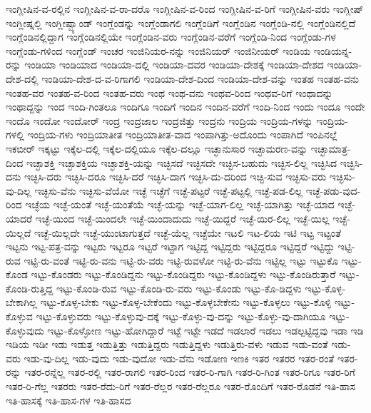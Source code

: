 {ಇಂಗ್ಲೀಷಿನ-ವ-ರಲ್ಲಿನ
ಇಂಗ್ಲೀಷಿನ-ವ-ರಾ-ದರೊ
ಇಂಗ್ಲೀಷಿನ-ವ-ರಿಂದ
ಇಂಗ್ಲೀಷಿನ-ವ-ರಿಗೆ
ಇಂಗ್ಲೀಷಿನ-ವರು
ಇಂಗ್ಲೀಷ್
ಇಂಗ್ಲೀಷ್ನಲ್ಲಿ
ಇಂಗ್ಲೀಷ್ಬ್ಯಾಂಡ್
ಇಂಗ್ಲೆಂಡನ್ನು
ಇಂಗ್ಲೆಂಡಾಗಲಿ
ಇಂಗ್ಲೆಂಡಿಗೆ
ಇಂಗ್ಲೆಂಡಿನ
ಇಂಗ್ಲೆಂಡಿ-ನಲ್ಲಿ
ಇಂಗ್ಲೆಂಡಿನಲ್ಲಿದೆ
ಇಂಗ್ಲೆಂಡಿನಲ್ಲಿದ್ದಾಗ
ಇಂಗ್ಲೆಂಡಿನಲ್ಲಿಯೇ
ಇಂಗ್ಲೆಂಡಿನ-ವರು
ಇಂಗ್ಲೆಂಡಿನ-ವರೆಗೆ
ಇಂಗ್ಲೆಂಡಿ-ನಿಂದ
ಇಂಗ್ಲೆಂಡು-ಗಳ
ಇಂಗ್ಲೆಂಡು-ಗಳಿಂದ
ಇಂಗ್ಲೆಂಡ್
ಇಂಚರ
ಇಂಜಿನಿಯರ-ನನ್ನು
ಇಂಜಿನಿಯರ್
ಇಂಜಿನೀಯರ್
ಇಂಡಿಯ
ಇಂಡಿಯನ್ನ-ರನ್ನು
ಇಂಡಿಯಾ
ಇಂಡಿಯಾದ
ಇಂಡಿಯಾ-ದಲ್ಲಿ
ಇಂಡಿಯಾ-ದವರ
ಇಂಡಿಯಾ-ದೇಶಕ್ಕೆ
ಇಂಡಿಯಾ-ದೇಶದ
ಇಂಡಿಯಾ-ದೇಶ-ದಲ್ಲಿ
ಇಂಡಿಯಾ-ದೇಶ-ದ-ವ-ರಿಗಾಗಲಿ
ಇಂಡಿಯಾ-ದೇಶ-ದಿಂದ
ಇಂಡಿಯಾ-ದೇಶ-ವನ್ನು
ಇಂತಹ
ಇಂತಹ-ವನು
ಇಂತಹ-ವರ
ಇಂತಹ-ವ-ರಿಂದ
ಇಂತಹ-ವರು
ಇಂಥ
ಇಂಥ-ವನು
ಇಂಥವ-ರಿಂದ
ಇಂಥವ-ರಿಗೆ
ಇಂಥಾದನ್ನು
ಇಂಥಾದ್ದನ್ನು
ಇಂದ
ಇಂದಿ-ಗಿಂತಲೂ
ಇಂದಿಗೂ
ಇಂದಿಗೆ
ಇಂದಿನ
ಇಂದಿನ-ವರೆಗೆ
ಇಂದಿ-ನಿಂದ
ಇಂದು
ಇಂದೂ
ಇಂದೇ
ಇಂದೊ
ಇಂದೋ
ಇಂದೋರ್
ಇಂದ್ರ
ಇಂದ್ರಜಾಲ
ಇಂದ್ರಜಿತ್ತು
ಇಂದ್ರನು
ಇಂದ್ರಿಯ
ಇಂದ್ರಿಯ-ಗಳನ್ನು
ಇಂದ್ರಿಯ-ಗಳಲ್ಲಿ
ಇಂದ್ರಿಯ-ಗಳು
ಇಂದ್ರಿಯಾತೀತ
ಇಂದ್ರಿಯಾತೀತ-ವಾದ
ಇಂಪಾಗಿತ್ತು-ಅದೊಂದು
ಇಂಪಾಗಿದೆ
ಇಂಪಿನಲ್ಲೆ
ಇಕಬೀರ್
ಇಕ್ಕಟ್ಟು
ಇಕ್ಕೆಲ-ದಲ್ಲಿ
ಇಕ್ಕೆಲ-ದಲ್ಲಿಯೂ
ಇಕ್ಕೆಲ-ದಲ್ಲೂ
ಇಚ್ಛಾನುಸಾರ
ಇಚ್ಛಾಮರಣ-ವನ್ನು
ಇಚ್ಛಾಮಾತ್ರ-ದಿಂದ
ಇಚ್ಛಾಶಕ್ತಿ
ಇಚ್ಛಾಶಕ್ತಿಯ
ಇಚ್ಛಾಶಕ್ತಿ-ಯನ್ನು
ಇಚ್ಛಿಸದೆ
ಇಚ್ಛಿಸದೇ
ಇಚ್ಛಿಸ-ಬಹುದು
ಇಚ್ಛಿಸ-ಲಿಲ್ಲ
ಇಚ್ಛಿಸಿದ
ಇಚ್ಛಿಸಿ-ದನು
ಇಚ್ಛಿಸಿ-ದರು
ಇಚ್ಛಿಸಿ-ದರೂ
ಇಚ್ಛಿಸಿ-ದರೆ
ಇಚ್ಛಿಸಿ-ದಾಗ
ಇಚ್ಛಿಸಿ-ದು-ದರಿಂದ
ಇಚ್ಛಿ-ಸುವ
ಇಚ್ಛಿಸು-ವರು
ಇಚ್ಛಿಸು-ವು-ದಿಲ್ಲ
ಇಚ್ಛಿಸು-ವೆನು
ಇಚ್ಛಿಸು-ವೆಯೋ
ಇಚ್ಛೆ
ಇಚ್ಛೆಗೆ
ಇಚ್ಛೆ-ಪಟ್ಟರೆ
ಇಚ್ಛೆ-ಪಟ್ಟಲ್ಲಿ
ಇಚ್ಛೆ-ಪಡ-ಲಿಲ್ಲ
ಇಚ್ಛೆ-ಪಡು-ವುದ-ರಿಂದ
ಇಚ್ಛೆಯ
ಇಚ್ಛೆ-ಯಂತೆ
ಇಚ್ಛೆ-ಯಂತೆಯೆ
ಇಚ್ಛೆ-ಯನ್ನು
ಇಚ್ಛೆ-ಯಾಗ-ಲಿಲ್ಲ
ಇಚ್ಛೆ-ಯಾಗಿತ್ತು
ಇಚ್ಛೆ-ಯಾದ
ಇಚ್ಛೆ-ಯಾದರೆ
ಇಚ್ಛೆ-ಯಿಂದ
ಇಚ್ಛೆ-ಯಿಂದಲೇ
ಇಚ್ಛೆ-ಯಿಂದಾದುದು
ಇಚ್ಛೆ-ಯಿದ್ದರೆ
ಇಚ್ಛೆ-ಯಿರ-ಲಿಲ್ಲ
ಇಚ್ಛೆ-ಯಿಲ್ಲ
ಇಚ್ಛೆ-ಯಿಲ್ಲದೆ
ಇಚ್ಛೆ-ಯಿಲ್ಲದೇ
ಇಚ್ಛೆ-ಯುಂಟಾಗುತ್ತದೆ
ಇಚ್ಛೆ-ಯೆಲ್ಲ
ಇಚ್ಛೆಯೇ
ಇಟಲಿ
ಇಟ-ಲಿಯ
ಇಟಿ
ಇಟ್ಟ
ಇಟ್ಟಂತೆ
ಇಟ್ಟನು
ಇಟ್ಟ-ಪತ್ರ-ವನ್ನು
ಇಟ್ಟರು
ಇಟ್ಟರೂ
ಇಟ್ಟರೆ
ಇಟ್ಟಾಗ
ಇಟ್ಟಿದ್ದ
ಇಟ್ಟಿದ್ದರು
ಇಟ್ಟಿದ್ದರೂ
ಇಟ್ಟಿದ್ದರೆ
ಇಟ್ಟಿದ್ದು
ಇಟ್ಟಿ-ರುವ
ಇಟ್ಟಿ-ರು-ವಂತೆ
ಇಟ್ಟಿ-ರು-ವನು
ಇಟ್ಟಿ-ರು-ವರು
ಇಟ್ಟಿ-ರುವಳೋ
ಇಟ್ಟಿ-ರು-ವೆನು
ಇಟ್ಟಿಲ್ಲ
ಇಟ್ಟು
ಇಟ್ಟುಕೊ
ಇಟ್ಟು-ಕೊಂಡ
ಇಟ್ಟು-ಕೊಂಡರು
ಇಟ್ಟು-ಕೊಂಡಿದ್ದನು
ಇಟ್ಟು-ಕೊಂಡಿದ್ದರು
ಇಟ್ಟು-ಕೊಂಡಿದ್ದಳು
ಇಟ್ಟು-ಕೊಂಡಿರುತ್ತಾರೆ
ಇಟ್ಟು-ಕೊಂಡಿ-ರುತ್ತಿದ್ದ
ಇಟ್ಟು-ಕೊಂಡಿ-ರುವ
ಇಟ್ಟು-ಕೊಂಡಿ-ರು-ವರು
ಇಟ್ಟು-ಕೊಂಡು
ಇಟ್ಟು-ಕೊ-ಡಿದ್ದಳು
ಇಟ್ಟು-ಕೊಳ್ಳ-ಬೇಕಾಗಿಲ್ಲ
ಇಟ್ಟು-ಕೊಳ್ಳ-ಬೇಕು
ಇಟ್ಟು-ಕೊಳ್ಳ-ಬೇಕೆಂದು
ಇಟ್ಟು-ಕೊಳ್ಳಬೇಕೇನು
ಇಟ್ಟು-ಕೊಳ್ಳಲು
ಇಟ್ಟು-ಕೊಳ್ಳಿ
ಇಟ್ಟು-ಕೊಳ್ಳುವ
ಇಟ್ಟು-ಕೊಳ್ಳುವರು
ಇಟ್ಟು-ಕೊಳ್ಳುವು-ದಕ್ಕೆ
ಇಟ್ಟು-ಕೊಳ್ಳು-ವು-ದನ್ನು
ಇಟ್ಟು-ಕೊಳ್ಳು-ವು-ದಾಗಿಯೂ
ಇಟ್ಟು-ಕೊಳ್ಳುವುದು
ಇಟ್ಟು-ಕೊಳ್ಳೋಣ
ಇಟ್ಟು-ಹೋಗಿದ್ದಾರೆ
ಇಟ್ಟೆ
ಇಟ್ಟೇ
ಇಡದೆ
ಇಡಲಾರೆ
ಇಡಲು
ಇಡಲ್ಪಟ್ಟಿದ್ದವು
ಇಡಾ
ಇಡಿ
ಇಡಿಯ
ಇಡೀ
ಇಡು
ಇಡುತ್ತ
ಇಡುತ್ತಿತ್ತು
ಇಡುತ್ತಿದ್ದರು
ಇಡುತ್ತಿದ್ದಳು
ಇಡುತ್ತಿರು-ವಳು
ಇಡುವ
ಇಡು-ವಂತೆ
ಇಡು-ವರು
ಇಡು-ವು-ದಿಲ್ಲ
ಇಡು-ವುದು
ಇಡು-ವುದೋ
ಇಡು-ವೆನು
ಇಡೋಣ
ಇಣಕಿ
ಇತರ
ಇತರರ
ಇತರ-ರಂತೆ
ಇತರ-ರನ್ನು
ಇತರ-ರನ್ನೆಲ್ಲ
ಇತರ-ರಲ್ಲಿ
ಇತರ-ರಾಗಲಿ
ಇತರ-ರಿಂದ
ಇತರ-ರಿ-ಗಾಗಿ
ಇತರ-ರಿ-ಗಿಂತ
ಇತರ-ರಿಗೂ
ಇತರ-ರಿಗೆ
ಇತರ-ರಿ-ಗೆಲ್ಲ
ಇತರರು
ಇತರ-ರೆದು-ರಿಗೆ
ಇತರ-ರೆಲ್ಲರ
ಇತರ-ರೆಲ್ಲರೂ
ಇತರ-ರೊಂದಿಗೆ
ಇತರ-ರೊಡನೆ
ಇತಿ-ಹಾಸ
ಇತಿ-ಹಾಸಕ್ಕೆ
ಇತಿ-ಹಾಸ-ಗಳ
ಇತಿ-ಹಾಸದ
}
